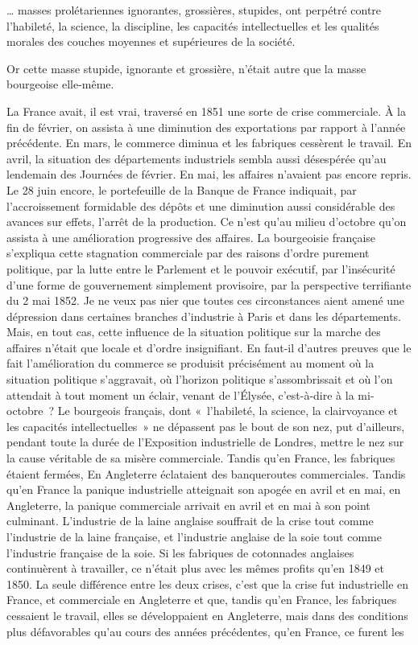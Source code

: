\documentclass[french,twoside]{book} %
\newenvironment{quoteblock}%
  {\begin{quoting}}
  {\end{quoting}}
\newenvironment{quotebar}{%
    \def\FrameCommand{{\color{rubric!10!}\vrule width 0.5em} \hspace{0.9em}}%
    \def\OuterFrameSep{\itemsep} %
    \MakeFramed {\advance\hsize-\width \FrameRestore}
  }%
  {%
    \endMakeFramed
  }
\renewenvironment{quoteblock}%
  {%
    \savenotes
    \setstretch{0.9}
    \normalfont
    \begin{quotebar}
  }
  {%
    \end{quotebar}
    \spewnotes
  }
\begin{document}
\begin{quoteblock}
 \noindent … masses prolétariennes ignorantes, grossières, stupides, ont perpétré contre l’habileté, la science, la discipline, les capacités intellectuelles et les qualités morales des couches moyennes et supérieures de la société.
\end{quoteblock}

\noindent Or cette masse stupide, ignorante et grossière, n’était autre que la masse bourgeoise elle-même.\par
La France avait, il est vrai, traversé en 1851 une sorte de crise commerciale. À la fin de février, on assista à une diminution des exportations par rapport à l’année précédente. En mars, le commerce diminua et les fabriques cessèrent le travail. En avril, la situation des départements industriels sembla aussi désespérée qu’au lendemain des Journées de février. En mai, les affaires n’avaient pas encore repris. Le 28 juin encore, le portefeuille de la Banque de France indiquait, par l’accroissement formidable des dépôts et une diminution aussi considérable des avances sur effets, l’arrêt de la production. Ce n’est qu’au milieu d’octobre qu’on assista à une amélioration progressive des affaires. La bourgeoisie française s’expliqua cette stagnation commerciale par des raisons d’ordre purement politique, par la lutte entre le Parlement et le pouvoir exécutif, par l’insécurité d’une forme de gouvernement simplement provisoire, par la perspective terrifiante du 2 mai 1852. Je ne veux pas nier que toutes ces circonstances aient amené une dépression dans certaines branches d’industrie à Paris et dans les départements. Mais, en tout cas, cette influence de la situation politique sur la marche des affaires n’était que locale et d’ordre insignifiant. En faut-il d’autres preuves que le fait l’amélioration du commerce se produisit précisément au moment où la situation politique s’aggravait, où l’horizon politique s’assombrissait et où l’on attendait à tout moment un éclair, venant de l’Élysée, c’est-à-dire à la mi-octobre ? Le bourgeois français, dont « l’habileté, la science, la clairvoyance et les capacités intellectuelles » ne dépassent pas le bout de son nez, put d’ailleurs, pendant toute la durée de l’Exposition industrielle de Londres, mettre le nez sur la cause véritable de sa misère commerciale. Tandis qu’en France, les fabriques étaient fermées, En Angleterre éclataient des banqueroutes commerciales. Tandis qu’en France la panique industrielle atteignait son apogée en avril et en mai, en Angleterre, la panique commerciale arrivait en avril et en mai à son point culminant. L’industrie de la laine anglaise souffrait de la crise tout comme l’industrie de la laine française, et l’industrie anglaise de la soie tout comme l’industrie française de la soie. Si les fabriques de cotonnades anglaises continuèrent à travailler, ce n’était plus avec les mêmes profits qu’en 1849 et 1850. La seule différence entre les deux crises, c’est que la crise fut industrielle en France, et commerciale en Angleterre et que, tandis qu’en France, les fabriques cessaient le travail, elles se développaient en Angleterre, mais dans des conditions plus défavorables qu’au cours des années précédentes, qu’en France, ce furent les 
\end{document}
